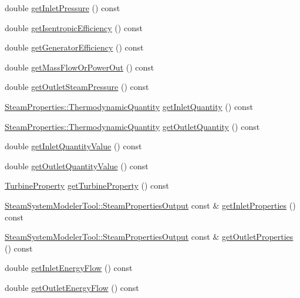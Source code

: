 \begin{DoxyCompactItemize}
\item 
double \hyperlink{class_turbine_a148ad3877851f1c3931d8a6771d750c5}{get\+Inlet\+Pressure} () const
\item 
double \hyperlink{class_turbine_a5d907859de4acc153a32bd443238b445}{get\+Isentropic\+Efficiency} () const
\item 
double \hyperlink{class_turbine_a92266fd994310d1842ba37c05bc40bf8}{get\+Generator\+Efficiency} () const
\item 
double \hyperlink{class_turbine_a820a090d264b96ee84f717555545c287}{get\+Mass\+Flow\+Or\+Power\+Out} () const
\item 
double \hyperlink{class_turbine_a1589b2364a553db7aaa875bb543d171d}{get\+Outlet\+Steam\+Pressure} () const
\item 
\hyperlink{class_steam_properties_ae0294bedf7d178c2d8fb6aed0f62fbff}{Steam\+Properties\+::\+Thermodynamic\+Quantity} \hyperlink{class_turbine_ac9e91d9539cea5cd1e0037c397c28c78}{get\+Inlet\+Quantity} () const
\item 
\hyperlink{class_steam_properties_ae0294bedf7d178c2d8fb6aed0f62fbff}{Steam\+Properties\+::\+Thermodynamic\+Quantity} \hyperlink{class_turbine_acd3e98ab67754b652de97498d9bec6d2}{get\+Outlet\+Quantity} () const
\item 
double \hyperlink{class_turbine_a3d8a3f317fa71abb3404144371615725}{get\+Inlet\+Quantity\+Value} () const
\item 
double \hyperlink{class_turbine_aca98f128213e02e95dfd6f4b2ad8de4e}{get\+Outlet\+Quantity\+Value} () const
\item 
\hyperlink{class_turbine_a5db4f65cf2539e3837684d53221ade12}{Turbine\+Property} \hyperlink{class_turbine_a14f6eff49b501aa8c5a22d404dbeaac0}{get\+Turbine\+Property} () const
\item 
\hyperlink{struct_steam_system_modeler_tool_1_1_steam_properties_output}{Steam\+System\+Modeler\+Tool\+::\+Steam\+Properties\+Output} const  \& \hyperlink{class_turbine_a7a906cf74affed9acfa4045964eccbf6}{get\+Inlet\+Properties} () const
\item 
\hyperlink{struct_steam_system_modeler_tool_1_1_steam_properties_output}{Steam\+System\+Modeler\+Tool\+::\+Steam\+Properties\+Output} const  \& \hyperlink{class_turbine_aa9449622449e78285a258823ff77c8ec}{get\+Outlet\+Properties} () const
\item 
double \hyperlink{class_turbine_ae5d55a7b882e4780d490d43409f8f06c}{get\+Inlet\+Energy\+Flow} () const
\item 
double \hyperlink{class_turbine_aa20c0f9dd81cd9bfd5eda77f588516b5}{get\+Outlet\+Energy\+Flow} () const

\end{DoxyCompactItemize}
